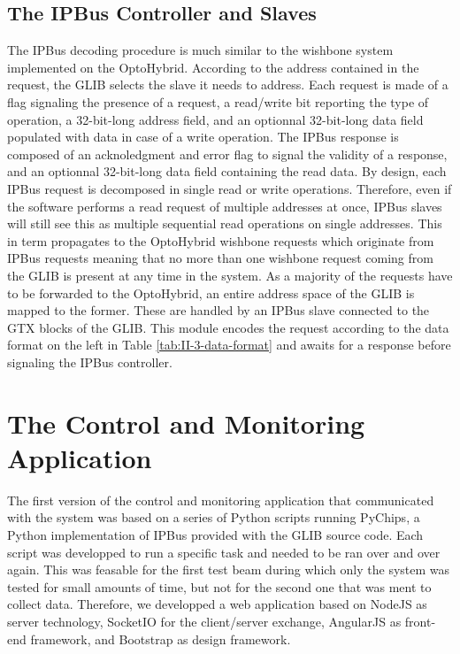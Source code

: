     \subsection{The IPBus Controller and Slaves}

      The IPBus decoding procedure is much similar to the wishbone system implemented on the OptoHybrid. According to the address contained in the request, the GLIB selects the slave it needs to address. Each request is made of a flag signaling the presence of a request, a read/write bit reporting the type of operation, a 32-bit-long address field, and an optionnal 32-bit-long data field populated with data in case of a write operation. The IPBus response is composed of an acknoledgment and error flag to signal the validity of a response, and an optionnal 32-bit-long data field containing the read data. By design, each IPBus request is decomposed in single read or write operations. Therefore, even if the software performs a read request of multiple addresses at once, IPBus slaves will still see this as multiple sequential read operations on single addresses. This in term propagates to the OptoHybrid wishbone requests which originate from IPBus requests meaning that no more than one wishbone request coming from the GLIB is present at any time in the system. As a majority of the requests have to be forwarded to the OptoHybrid, an entire address space of the GLIB is mapped to the former. These are handled by an IPBus slave connected to the GTX blocks of the GLIB. This module encodes the request according to the data format on the left in Table \ref{tab:II-3-data-format} and awaits for a response before signaling the IPBus controller.

  \section{The Control and Monitoring Application}

    The first version of the control and monitoring application that communicated with the system was based on a series of Python scripts running PyChips, a Python implementation of IPBus provided with the GLIB source code. Each script was developped to run a specific task and needed to be ran over and over again. This was feasable for the first test beam during which only the system was tested for small amounts of time, but not for the second one that was ment to collect data. Therefore, we developped a web application based on NodeJS \cite{NODEJS} as server technology, SocketIO \cite{SOCKETIO} for the client/server exchange, AngularJS \cite{ANGULARJS} as front-end framework, and Bootstrap \cite{BOOTSTRAP} as design framework.

